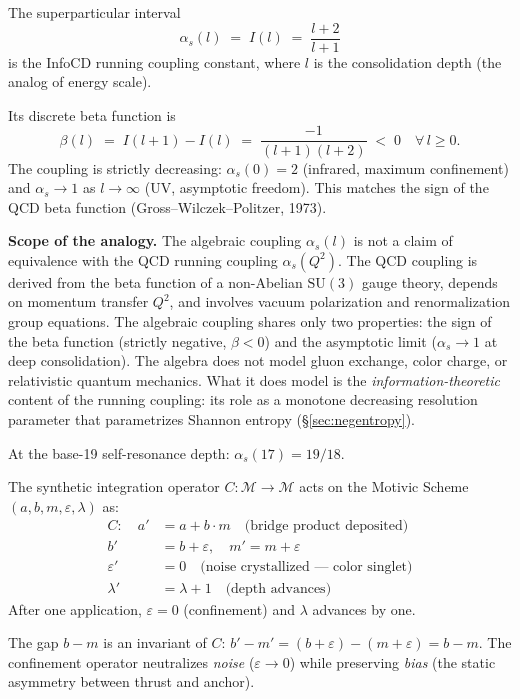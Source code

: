 The superparticular interval
\[
\alpha_s(l) \;=\; I(l) \;=\; \frac{l + 2}{l + 1}
\]
is the InfoCD running coupling constant, where $l$ is the
consolidation depth (the analog of energy scale).

Its discrete beta function is
\[
\beta(l) \;=\; I(l+1) - I(l) \;=\; \frac{-1}{(l+1)(l+2)} \;<\; 0
\quad \forall\, l \geq 0.
\]
The coupling is strictly decreasing: $\alpha_s(0) = 2$ (infrared,
maximum confinement) and $\alpha_s \to 1$ as $l \to \infty$ (UV,
asymptotic freedom). This matches the sign of the QCD beta function
(Gross--Wilczek--Politzer, 1973).

\textbf{Scope of the analogy.} The algebraic coupling $\alpha_s(l)$
is not a claim of equivalence with the QCD running coupling
$\alpha_s(Q^2)$. The QCD coupling is derived from the beta function
of a non-Abelian $\mathrm{SU}(3)$ gauge theory, depends on momentum
transfer $Q^2$, and involves vacuum polarization and renormalization
group equations. The algebraic coupling shares only two properties:
the sign of the beta function (strictly negative, $\beta < 0$) and
the asymptotic limit ($\alpha_s \to 1$ at deep consolidation). The
algebra does not model gluon exchange, color charge, or relativistic
quantum mechanics. What it does model is the \emph{information-theoretic}
content of the running coupling: its role as a monotone decreasing
resolution parameter that parametrizes Shannon entropy
(\S\ref{sec:negentropy}).

At the base-19 self-resonance depth: $\alpha_s(17) = 19/18$.

The synthetic integration operator $C : \mathcal{M} \to \mathcal{M}$
acts on the Motivic Scheme $(a, b, m, \varepsilon, \lambda)$ as:
\begin{align}
C: \quad
a' &= a + b \cdot m \quad \text{(bridge product deposited)} \\
b' &= b + \varepsilon, \quad m' = m + \varepsilon \\
\varepsilon' &= 0 \quad \text{(noise crystallized --- color singlet)} \\
\lambda' &= \lambda + 1 \quad \text{(depth advances)}
\end{align}
After one application, $\varepsilon = 0$ (confinement) and
$\lambda$ advances by one.

\begin{proposition}
\label{prop:schwarzian}
The gap $b - m$ is an invariant of $C$:
$b' - m' = (b + \varepsilon) - (m + \varepsilon) = b - m$.
The confinement operator neutralizes \emph{noise}
($\varepsilon \to 0$) while preserving \emph{bias}
(the static asymmetry between thrust and anchor).
\end{proposition}

